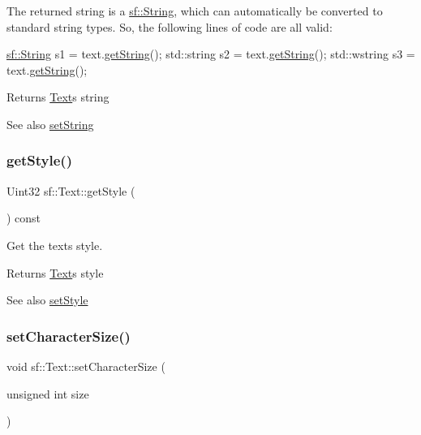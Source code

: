 The returned string is a \hyperlink{classsf_1_1_string}{sf\+::\+String}, which can automatically be converted to standard string types. So, the following lines of code are all valid\+: 
\begin{DoxyCode}
\hyperlink{classsf_1_1_string}{sf::String}   s1 = text.\hyperlink{classsf_1_1_text_a084c275eb4bca835696af5f8f9c80ab3}{getString}();
std::string  s2 = text.\hyperlink{classsf_1_1_text_a084c275eb4bca835696af5f8f9c80ab3}{getString}();
std::wstring s3 = text.\hyperlink{classsf_1_1_text_a084c275eb4bca835696af5f8f9c80ab3}{getString}();
\end{DoxyCode}


\begin{DoxyReturn}{Returns}
\hyperlink{classsf_1_1_text}{Text}\textquotesingle{}s string
\end{DoxyReturn}
\begin{DoxySeeAlso}{See also}
\hyperlink{classsf_1_1_text_a7d3b3359f286fd9503d1ced25b7b6c33}{set\+String} 
\end{DoxySeeAlso}
\mbox{\label{classsf_1_1_text_a0da79b0c057f4bb51592465a205c35d7}} 
\subsubsection{\texorpdfstring{get\+Style()}{getStyle()}}
{\footnotesize\ttfamily Uint32 sf\+::\+Text\+::get\+Style (\begin{DoxyParamCaption}{ }\end{DoxyParamCaption}) const}



Get the text\textquotesingle{}s style. 

\begin{DoxyReturn}{Returns}
\hyperlink{classsf_1_1_text}{Text}\textquotesingle{}s style
\end{DoxyReturn}
\begin{DoxySeeAlso}{See also}
\hyperlink{classsf_1_1_text_ad791702bc2d1b6590a1719aa60635edf}{set\+Style} 
\end{DoxySeeAlso}
\mbox{\label{classsf_1_1_text_ae96f835fc1bff858f8a23c5b01eaaf7e}} 
\subsubsection{\texorpdfstring{set\+Character\+Size()}{setCharacterSize()}}
{\footnotesize\ttfamily void sf\+::\+Text\+::set\+Character\+Size (\begin{DoxyParamCaption}\item[{unsigned int}]{size }\end{DoxyParamCaption})}



